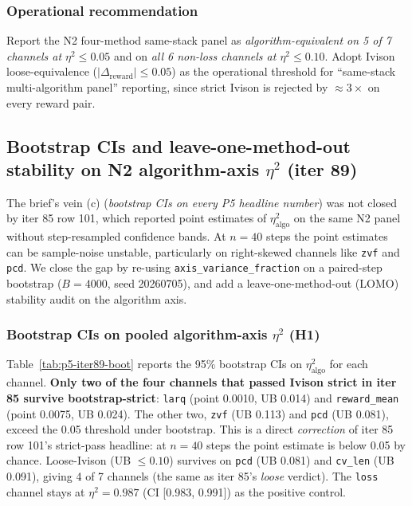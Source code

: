 \documentclass{article}  \usepackage[preprint,nonatbib]{neurips_2026} \usepackage[numbers]{natbib}
\begin{document}
\subsubsection{Operational recommendation}
\label{sec:p5-iter85-op}
Report the N2 four-method same-stack panel as
\emph{algorithm-equivalent on 5 of 7 channels at $\eta^2 \le 0.05$}
and on \emph{all 6 non-loss channels at $\eta^2 \le 0.10$}.
Adopt Ivison loose-equivalence ($|\Delta_{\mathrm{reward}}| \le 0.05$)
as the operational threshold for ``same-stack multi-algorithm panel''
reporting, since strict Ivison is rejected by $\approx 3\times$ on
every reward pair. \subsection{Bootstrap CIs and leave-one-method-out stability on N2 algorithm-axis $\eta^2$ (iter 89)}
\label{sec:p5-iter89-n2-bootstrap}

The brief's vein (c) (\emph{bootstrap CIs on every P5 headline number})
was not closed by iter 85 row 101, which reported point estimates of
$\eta^2_{\mathrm{algo}}$ on the same N2 panel without step-resampled
confidence bands. At $n{=}40$ steps the point estimates can be
sample-noise unstable, particularly on right-skewed channels like
\texttt{zvf} and \texttt{pcd}. We close the gap by re-using
\texttt{axis\_variance\_fraction} on a paired-step bootstrap
($B{=}4000$, seed 20260705), and add a leave-one-method-out (LOMO)
stability audit on the algorithm axis.

\subsubsection{Bootstrap CIs on pooled algorithm-axis $\eta^2$ (H1)}
\label{sec:p5-iter89-h1}
Table~\ref{tab:p5-iter89-boot} reports the 95\% bootstrap CIs on
$\eta^2_{\mathrm{algo}}$ for each channel. \textbf{Only two of the
four channels that passed Ivison strict in iter 85 survive
bootstrap-strict}: \texttt{larq} (point 0.0010, UB 0.014) and
\texttt{reward\_mean} (point 0.0075, UB 0.024). The other two,
\texttt{zvf} (UB 0.113) and \texttt{pcd} (UB 0.081), exceed the
0.05 threshold under bootstrap. This is a direct \emph{correction}
of iter 85 row 101's strict-pass headline: at $n{=}40$ steps the
point estimate is below 0.05 by chance. Loose-Ivison (UB
$\leq 0.10$) survives on \texttt{pcd} (UB 0.081) and
\texttt{cv\_len} (UB 0.091), giving 4 of 7 channels (the same as
iter 85's \emph{loose} verdict). The \texttt{loss} channel stays
at $\eta^2{=}0.987$ (CI [0.983, 0.991]) as the positive control.
\end{document}
